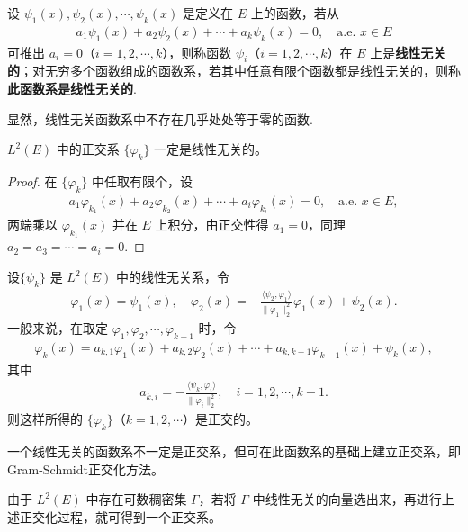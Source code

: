 \documentclass[../../main.tex]{subfiles}%
\begin{document}
\begin{definition}
设 $\psi_1(x), \psi_2(x), \cdots, \psi_k(x)$ 是定义在 $E$ 上的函数，若从
\begin{align*}
a_1 \psi_1(x) + a_2 \psi_2(x) + \cdots + a_k \psi_k(x) = 0, \quad \text{a.e. } x \in E
\end{align*}
可推出 $a_i = 0$（$i=1,2,\cdots,k$），则称函数 $\psi_i$（$i=1,2,\cdots,k$）在 $E$ 上是\textbf{线性无关的}；对无穷多个函数组成的函数系，若其中任意有限个函数都是线性无关的，则称\textbf{此函数系是线性无关的}.
\end{definition}
\begin{remark}
显然，线性无关函数系中不存在几乎处处等于零的函数.
\end{remark}

\begin{example}
$L^2(E)$ 中的正交系 $\{\varphi_k\}$ 一定是线性无关的。
\end{example}
\begin{proof}

在 $\{\varphi_k\}$ 中任取有限个，设
\begin{align*}
a_1 \varphi_{k_1}(x) + a_2 \varphi_{k_2}(x) + \cdots + a_i \varphi_{k_i}(x) = 0, \quad \text{a.e. } x \in E,
\end{align*}
两端乘以 $\varphi_{k_1}(x)$ 并在 $E$ 上积分，由正交性得 $a_1 = 0$，同理 $a_2 = a_3 = \cdots = a_i = 0$.

\end{proof}

\begin{theorem}
设$\{\psi_k\}$ 是 $L^2(E)$ 中的线性无关系，令
\begin{gather*}
\varphi_1(x) = \psi_1(x), \quad \varphi_2(x) = -\frac{\langle \psi_2, \varphi_1 \rangle}{\|\varphi_1\|_2^2} \varphi_1(x) + \psi_2(x).
\end{gather*}
一般来说，在取定 $\varphi_1, \varphi_2, \cdots, \varphi_{k-1}$ 时，令
\begin{gather*}
\varphi_k(x) = a_{k,1}\varphi_1(x) + a_{k,2}\varphi_2(x) + \cdots + a_{k,k-1}\varphi_{k-1}(x) + \psi_k(x),
\end{gather*}
其中
\begin{align*}
a_{k,i} = -\frac{\langle \psi_k, \varphi_i \rangle}{\|\varphi_i\|_2^2}, \quad i=1,2,\cdots,k-1.
\end{align*}
则这样所得的 $\{\varphi_k\}$（$k=1,2,\cdots$）是正交的。
\end{theorem}
\begin{remark}
一个线性无关的函数系不一定是正交系，但可在此函数系的基础上建立正交系，即Gram-Schmidt正交化方法。

由于 $L^2(E)$ 中存在可数稠密集 $\Gamma$，若将 $\Gamma$ 中线性无关的向量选出来，再进行上述正交化过程，就可得到一个正交系。
\end{remark}
\end{document}
